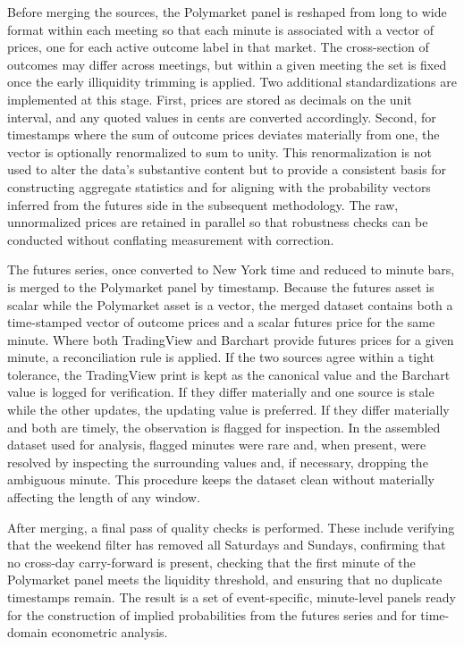 Before merging the sources, the Polymarket panel is reshaped from long to wide format within each meeting so that each minute is associated with a vector of prices, one for each active outcome label in that market. The cross-section of outcomes may differ across meetings, but within a given meeting the set is fixed once the early illiquidity trimming is applied. Two additional standardizations are implemented at this stage. First, prices are stored as decimals on the unit interval, and any quoted values in cents are converted accordingly. Second, for timestamps where the sum of outcome prices deviates materially from one, the vector is optionally renormalized to sum to unity. This renormalization is not used to alter the data’s substantive content but to provide a consistent basis for constructing aggregate statistics and for aligning with the probability vectors inferred from the futures side in the subsequent methodology. The raw, unnormalized prices are retained in parallel so that robustness checks can be conducted without conflating measurement with correction.


The futures series, once converted to New York time and reduced to minute bars, is merged to the Polymarket panel by timestamp. Because the futures asset is scalar while the Polymarket asset is a vector, the merged dataset contains both a time-stamped vector of outcome prices and a scalar futures price for the same minute. Where both TradingView and Barchart provide futures prices for a given minute, a reconciliation rule is applied. If the two sources agree within a tight tolerance, the TradingView print is kept as the canonical value and the Barchart value is logged for verification. If they differ materially and one source is stale while the other updates, the updating value is preferred. If they differ materially and both are timely, the observation is flagged for inspection. In the assembled dataset used for analysis, flagged minutes were rare and, when present, were resolved by inspecting the surrounding values and, if necessary, dropping the ambiguous minute. This procedure keeps the dataset clean without materially affecting the length of any window.

After merging, a final pass of quality checks is performed. These include verifying that the weekend filter has removed all Saturdays and Sundays, confirming that no cross-day carry-forward is present, checking that the first minute of the Polymarket panel meets the liquidity threshold, and ensuring that no duplicate timestamps remain. The result is a set of event-specific, minute-level panels ready for the construction of implied probabilities from the futures series and for time-domain econometric analysis.

